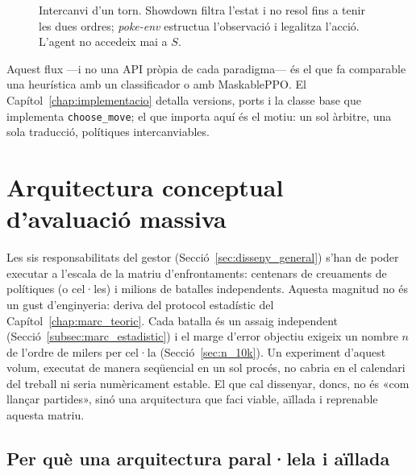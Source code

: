 \begin{figure}[htbp]
    \caption{Intercanvi d'un torn. Showdown filtra l'estat i no resol fins a tenir les dues ordres; \textit{poke-env} estructua l'observació i legalitza l'acció. L'agent no accedeix mai a $S$.}
    \label{fig:cicle_batalla}
\end{figure}

Aquest flux ---i no una API pròpia de cada paradigma--- és el que fa comparable una heurística amb un classificador o amb MaskablePPO. El Capítol~\ref{chap:implementacio} detalla versions, ports i la classe base que implementa \texttt{choose\_move}; el que importa aquí és el motiu: un sol àrbitre, una sola traducció, polítiques intercanviables.

\section{Arquitectura conceptual d'avaluació massiva}
\label{sec:arquitectura_avaluacio}

Les sis responsabilitats del gestor (Secció~\ref{sec:disseny_general}) s'han de poder executar a l'escala de la matriu d'enfrontaments: centenars de creuaments de polítiques (o cel·les) i milions de batalles independents. Aquesta magnitud no és un gust d'enginyeria: deriva del protocol estadístic del Capítol~\ref{chap:marc_teoric}. Cada batalla és un assaig independent (Secció~\ref{subsec:marc_estadistic}) i el marge d'error objectiu exigeix un nombre $n$ de l'ordre de milers per cel·la (Secció~\ref{sec:n_10k}). Un experiment d'aquest volum, executat de manera seqüencial en un sol procés, no cabria en el calendari del treball ni seria numèricament estable. El que cal dissenyar, doncs, no és «com llançar partides», sinó una arquitectura que faci viable, aïllada i reprenable aquesta matriu.

\subsection{Per què una arquitectura paral·lela i aïllada}
\label{subsec:motiu_paralela}

